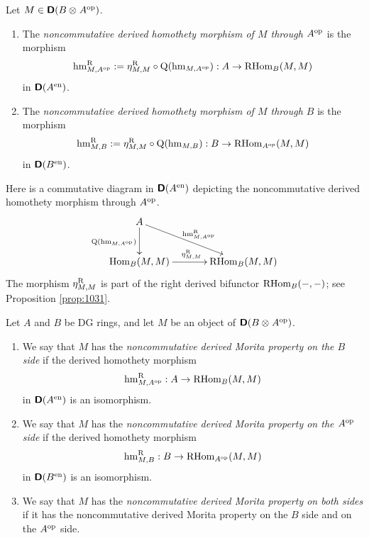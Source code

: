 \begin{dfn} \label{dfn:3565}
Let $M \in \boldsymbol{\mathsf{D}}(B \otimes_{} A^{\mathrm{op}})$.
\begin{enumerate}
\item The {\em noncommutative derived homothety morphism of $M$ through
$A^{\mathrm{op}}$} is the morphism 
\[ \operatorname{hm}^{\mathrm{R}}_{M, A^{\mathrm{op}}} := \eta^{\mathrm{R}}_{M, M} \circ 
\operatorname{Q}(\operatorname{hm}_{M, A^{\mathrm{op}}}) : A \to \operatorname{RHom}_{B}(M, M) \]
in $\boldsymbol{\mathsf{D}}(A^{\mathrm{en}})$.

\item The {\em noncommutative derived homothety morphism of $M$ through $B$} is 
the morphism 
\[ \operatorname{hm}^{\mathrm{R}}_{M, B} := \eta^{\mathrm{R}}_{M, M} 
\circ \operatorname{Q}(\operatorname{hm}_{M, B}) : B \to \operatorname{RHom}_{A^{\mathrm{op}}}(M, M)  \]
in $\boldsymbol{\mathsf{D}}(B^{\mathrm{en}})$.
\end{enumerate}
\end{dfn}

Here is a commutative diagram in $\boldsymbol{\mathsf{D}}(A^{\mathrm{en}})$ depicting the 
noncommutative derived homothety morphism through $A^{\mathrm{op}}$.
\[ \UseTips \xymatrix @C=8ex @R=6ex {
A
\ar[d]_{\opn{Q}( \opn{hm}_{M, A^{\mrm{op}}} )}
\ar[dr]^{ \opn{hm}^{\mrm{R}}_{M, A^{\mrm{op}}} }
\\
\opn{Hom}_{B}(M, M)
\ar[r]^{\eta^{\mrm{R}}_{M, M}}
&
\opn{RHom}_{B}(M, M)
} \]
The morphism $\eta^{\mathrm{R}}_{M, M}$ is part of the right derived bifunctor 
$\operatorname{RHom}_{B}(-, -)$; see Proposition \ref{prop:1031}. 

\begin{dfn} \label{3455}
Let $A$ and $B$ be DG rings, and let $M$ be an object of 
$\boldsymbol{\mathsf{D}}(B \otimes_{} A^{\mathrm{op}})$.
\begin{enumerate}
\item We say that $M$ has the {\em noncommutative derived Morita property on 
the $B$ side} if the derived homothety morphism
\[ \operatorname{hm}^{\mathrm{R}}_{M, A^{\mathrm{op}}} : A \to \operatorname{RHom}_{B}(M, M) \]
in $\boldsymbol{\mathsf{D}}(A^{\mathrm{en}})$ is an isomorphism. 

\item We say that $M$ has the {\em noncommutative derived Morita property on 
the $A^{\mathrm{op}}$ side} if the derived homothety morphism
\[ \operatorname{hm}^{\mathrm{R}}_{M, B} : B \to 
\operatorname{RHom}_{A^{\mathrm{op}}}(M, M)  \]
in $\boldsymbol{\mathsf{D}}(B^{\mathrm{en}})$ is an isomorphism. 

\item We say that $M$ has the {\em noncommutative derived Morita property on 
both sides} if it has the noncommutative derived Morita property on 
the $B$ side and on the $A^{\mathrm{op}}$ side.
\end{enumerate}
\end{dfn}

